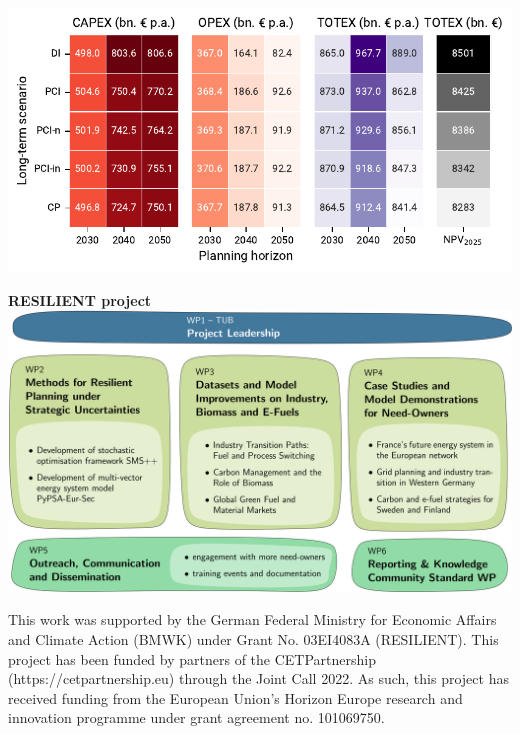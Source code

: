 \documentclass[a0,portrait]{a0poster}
\begin{document}
\begin{multicols}{3}
\begin{center}
  \includegraphics[width=\linewidth]{totex_heatmap.pdf}
  \label{fig:system_costs}
\end{center}
\vspace{2em}

\noindent \textcolor{red100}{\huge \textbf{RESILIENT project}}
\\

\noindent\includegraphics[width=\linewidth]{resilient_project_structure.png}

\noindent This work was supported by the German Federal Ministry for Economic Affairs and Climate Action (BMWK) under Grant No. 03EI4083A (RESILIENT). This project has been funded by partners of the CETPartnership (https://cetpartnership.eu) through the Joint Call 2022. As such, this project has received funding from the European Union's Horizon Europe research and innovation programme under grant agreement no. 101069750.


\singlespacing
\small




\end{multicols}
\end{document}

